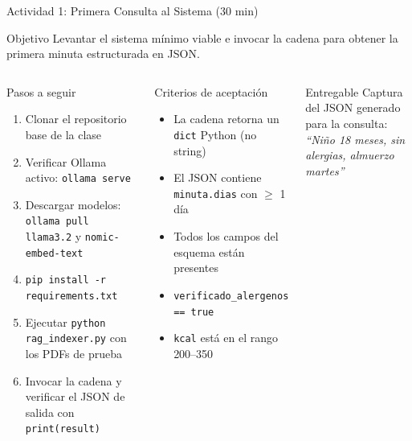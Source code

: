 \documentclass[aspectratio=169]{beamer}
\begin{document}
\begin{frame}{Actividad 1: Primera Consulta al Sistema (30 min)}
  \begin{block}{Objetivo}
    Levantar el sistema mínimo viable e invocar la cadena para obtener
    la primera minuta estructurada en JSON.
  \end{block}
  \vspace{0.3em}
  \begin{columns}
    \begin{exampleblock}{Pasos a seguir}
      \begin{enumerate}
        \item Clonar el repositorio base de la clase
        \item Verificar Ollama activo: \texttt{ollama serve}
        \item Descargar modelos: \texttt{ollama pull llama3.2} y \texttt{nomic-embed-text}
        \item \texttt{pip install -r requirements.txt}
        \item Ejecutar \texttt{python rag\_indexer.py} con los PDFs de prueba
        \item Invocar la cadena y verificar el JSON de salida con \texttt{print(result)}
      \end{enumerate}
    \end{exampleblock}
    \begin{alertblock}{Criterios de aceptación}
      \begin{itemize}
        \item La cadena retorna un \texttt{dict} Python (no string)
        \item El JSON contiene \texttt{minuta.dias} con $\geq$ 1 día
        \item Todos los campos del esquema están presentes
        \item \texttt{verificado\_alergenos == true}
        \item \texttt{kcal} está en el rango 200--350
      \end{itemize}
    \end{alertblock}
    \vspace{0.4em}
    \begin{block}{Entregable}
      Captura del JSON generado para la consulta:\\
      \textit{``Niño 18 meses, sin alergias, almuerzo martes''}
    \end{block}
  \end{columns}
\end{frame}
\end{document}
